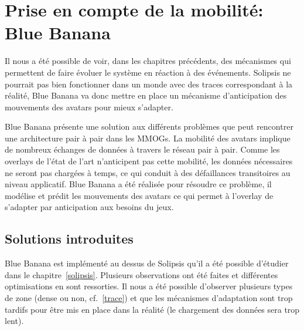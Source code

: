 \section{Prise en compte de la mobilité: Blue Banana}
	\label{BlueBanana}
	Il nous a été possible de voir, dans les chapitres précédents, des mécanismes qui permettent de faire évoluer le système en réaction à des événements. Solipsis ne pourrait pas bien fonctionner dans un monde avec des traces correspondant à la réalité, Blue Banana va donc mettre en place un mécanisme d'anticipation des mouvements des avatars pour mieux s'adapter.
	\par Blue Banana présente une solution aux différents problèmes que peut rencontrer une architecture pair à pair dans les MMOGs. La mobilité des avatars implique de nombreux échanges de données à travers le réseau pair à pair. Comme les overlays de l'état de l'art n'anticipent pas cette mobilité, les données nécessaires ne seront pas chargées à temps, ce qui conduit à des défaillances transitoires au niveau applicatif. Blue Banana a été réalisée pour résoudre ce problème, il modélise et prédit les mouvements des avatars ce qui permet à l'overlay de s'adapter par anticipation aux besoins du jeux.
	\subsection{Solutions introduites}
	Blue Banana est implémenté au dessus de Solipsis qu'il a été possible d'étudier dans le chapitre~\ref{solipsis}. Plusieurs observations ont été faites et différentes optimisations en sont ressorties. Il nous a été possible d'observer plusieurs types de zone (dense ou non, cf.~\ref{trace}) et que les mécanismes d'adaptation sont trop tardifs pour être mis en place dans la réalité (le chargement des données sera trop lent).
